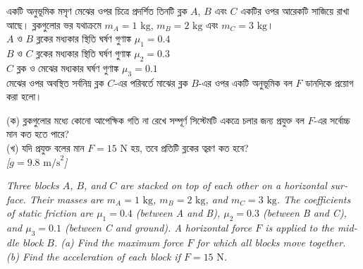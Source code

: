\documentclass[12pt, a4paper]{article}
\begin{document}
\begin{tcolorbox}[questionbox={প্রশ্ন (Question) 3}]
\noindent
একটি অনুভূমিক মসৃণ মেঝের ওপর চিত্রে প্রদর্শিত তিনটি ব্লক $A$, $B$ এবং $C$ একটির ওপর আরেকটি সাজিয়ে রাখা আছে। ব্লকগুলোর ভর যথাক্রমে $m_A = 1\text{ kg}$, $m_B = 2\text{ kg}$ এবং $m_C = 3\text{ kg}$। \\
$A$ ও $B$ ব্লকের মধ্যকার স্থিতি ঘর্ষণ গুণাঙ্ক $\mu_1 = 0.4$ \\
$B$ ও $C$ ব্লকের মধ্যকার স্থিতি ঘর্ষণ গুণাঙ্ক $\mu_2 = 0.3$ \\
$C$ ব্লক ও মেঝের মধ্যকার ঘর্ষণ গুণাঙ্ক $\mu_3 = 0.1$ \\
মেঝের ওপর অবস্থিত সর্বনিম্ন ব্লক $C$-এর পরিবর্তে মাঝের ব্লক $B$-এর ওপর একটি অনুভূমিক বল $F$ ডানদিকে প্রয়োগ করা হলো। 

\vspace{0.3em}
\noindent
(ক) ব্লকগুলোর মধ্যে কোনো আপেক্ষিক গতি না রেখে সম্পূর্ণ সিস্টেমটি একত্রে চলার জন্য প্রযুক্ত বল $F$-এর সর্বোচ্চ মান কত হতে পারে? \\
(খ) যদি প্রযুক্ত বলের মান $F = 15\text{ N}$ হয়, তবে প্রতিটি ব্লকের ত্বরণ কত হবে? \\
\textit{[$g = 9.8\text{ m/s}^2$]}

\vspace{0.8em}
\begin{english}
\noindent\textit{\color{darkgray}
Three blocks $A$, $B$, and $C$ are stacked on top of each other on a horizontal surface. Their masses are $m_A = 1\text{ kg}$, $m_B = 2\text{ kg}$, and $m_C = 3\text{ kg}$. The coefficients of static friction are $\mu_1 = 0.4$ (between A and B), $\mu_2 = 0.3$ (between B and C), and $\mu_3 = 0.1$ (between C and ground). A horizontal force $F$ is applied to the middle block $B$. (a) Find the maximum force $F$ for which all blocks move together. (b) Find the acceleration of each block if $F = 15\text{ N}$.
}
\end{english}
\end{tcolorbox}
\end{document}
